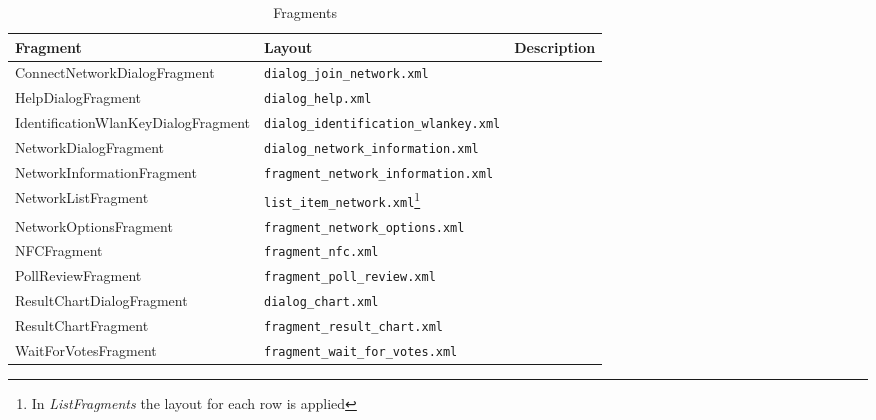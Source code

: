 \documentclass[numbers=noenddot, abstract=on, a4paper, headsepline,
footsepline, oneside, draft=off]{scrreprt}
\begin{document}
\begin{table}[htbp]
	\centering
	\begin{minipage}{\linewidth}
	\begin{tabularx}{\textwidth}{llX}
		\toprule
		\textbf{Fragment}						& \textbf{Layout}				& 	\textbf{Description}			\\
		\midrule
		ConnectNetworkDialogFragment			& \texttt{dialog\_join\_network.xml}			& 	\\
		HelpDialogFragment						& \texttt{dialog\_help.xml}						& 	\\
		IdentificationWlanKeyDialogFragment		& \texttt{dialog\_identification\_wlankey.xml}	&	\\
		NetworkDialogFragment					& \texttt{dialog\_network\_information.xml}		&	\\
		NetworkInformationFragment				& \texttt{fragment\_network\_information.xml}	&	\\
		NetworkListFragment						& \texttt{list\_item\_network.xml}\footnote{In
		\emph{ListFragments} the layout for each row is applied} 								&	\\
		NetworkOptionsFragment					& \texttt{fragment\_network\_options.xml}		& 	\\
		NFCFragment								& \texttt{fragment\_nfc.xml}					&	\\
		PollReviewFragment						& \texttt{fragment\_poll\_review.xml}			&	\\
		ResultChartDialogFragment				& \texttt{dialog\_chart.xml}					&	\\
		ResultChartFragment						& \texttt{fragment\_result\_chart.xml}			&	\\
		WaitForVotesFragment					& \texttt{fragment\_wait\_for\_votes.xml}		&	\\
		\bottomrule
	\end{tabularx}
	\end{minipage}
	\caption{Fragments}
	\label{tab:fragments}
\end{table}
\end{document}
